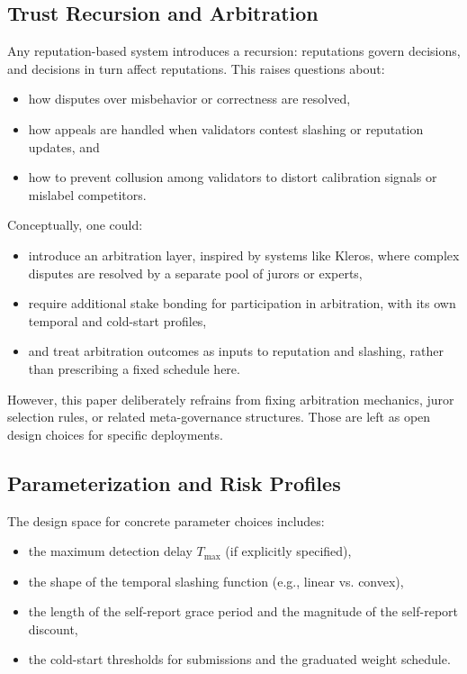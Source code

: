 \documentclass[11pt]{article}
\begin{document}
\subsection{Trust Recursion and Arbitration}

Any reputation-based system introduces a recursion: reputations govern decisions, and decisions in turn affect reputations.
This raises questions about:
\begin{itemize}[leftmargin=*]
  \item how disputes over misbehavior or correctness are resolved,
  \item how appeals are handled when validators contest slashing or reputation updates, and
  \item how to prevent collusion among validators to distort calibration signals or mislabel competitors.
\end{itemize}

Conceptually, one could:
\begin{itemize}[leftmargin=*]
  \item introduce an arbitration layer, inspired by systems like Kleros, where complex disputes are resolved by a separate pool of jurors or experts,
  \item require additional stake bonding for participation in arbitration, with its own temporal and cold-start profiles,
  \item and treat arbitration outcomes as inputs to reputation and slashing, rather than prescribing a fixed schedule here.
\end{itemize}

However, this paper deliberately refrains from fixing arbitration mechanics, juror selection rules, or related meta-governance structures.
Those are left as open design choices for specific deployments.

\subsection{Parameterization and Risk Profiles}

The design space for concrete parameter choices includes:
\begin{itemize}[leftmargin=*]
  \item the maximum detection delay \(T_{\max}\) (if explicitly specified),
  \item the shape of the temporal slashing function (e.g., linear vs. convex),
  \item the length of the self-report grace period and the magnitude of the self-report discount,
  \item the cold-start thresholds for submissions and the graduated weight schedule.
\end{itemize}
\end{document}
